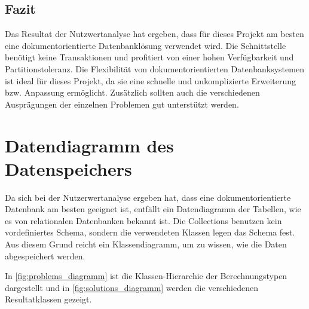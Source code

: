 \FloatBarrier
\subsection{Fazit}\label{architektur_fazit}
Das Resultat der Nutzwertanalyse hat ergeben, dass für dieses Projekt am besten eine dokumentorientierte Datenbanklösung verwendet wird.
Die Schnittstelle benötigt keine Transaktionen und profitiert von einer hohen Verfügbarkeit und Partitionstoleranz. Die Flexibilität
von dokumentorientierten Datenbanksystemen ist ideal für dieses Projekt, da sie eine schnelle und unkomplizierte Erweiterung bzw. Anpassung ermöglicht. Zusätzlich sollten 
auch die verschiedenen Ausprägungen der einzelnen Problemen gut unterstützt werden.

\newpage

\section{Datendiagramm des Datenspeichers}\label{datendiagramm_datenspeicher}
Da sich bei der Nutzerwertanalyse ergeben hat, dass eine dokumentorientierte Datenbank am besten geeignet ist, entfällt ein Datendiagramm der Tabellen, wie es von relationalen Datenbanken 
bekannt ist. Die Collections benutzen kein vordefiniertes Schema, sondern die verwendeten Klassen legen das Schema fest. Aus diesem Grund reicht ein Klassendiagramm, um zu wissen, wie 
die Daten abgespeichert werden.

In \autoref{fig:problems_diagramm} ist die Klassen-Hierarchie der Berechnungstypen dargestellt und in \autoref{fig:solutions_diagramm} werden die verschiedenen 
Resultatklassen gezeigt.


